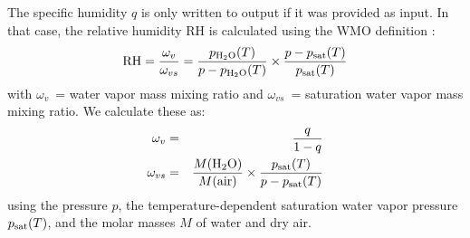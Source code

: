 \documentclass[twoside]{article}
\begin{document}
The specific humidity $q$ is only written to output if it was provided
as input. In that case, the relative humidity RH is calculated using the
WMO definition \citep{1660}:
\begin{equation}
  \mbox{RH} = \frac{\omega_v}{\omega_{vs}} = 
\frac{p_{\chem{H_2O}}(T)}{p - p_{\chem{H_2O}}(T)} \times
\frac{p - p_{\rm sat}(T)}{p_{\rm sat}(T)}
\end{equation}
with $\omega_v$~= water vapor mass mixing ratio and $\omega_{vs}$~=
saturation water vapor mass mixing ratio. We calculate these as:
\begin{eqnarray}
  \omega_v & = & \frac{q}{1-q}\\
  \omega_{vs} & = & \frac{M(\chem{H_2O})}{M({\rm air})} \times
  \frac{p_{\rm sat}(T)}{p - p_{\rm sat}(T)} 
\end{eqnarray}
using the pressure $p$, the temperature-dependent saturation water vapor
pressure $p_{\rm sat}(T)$, and the molar masses $M$ of water and dry
air.
\end{document}
